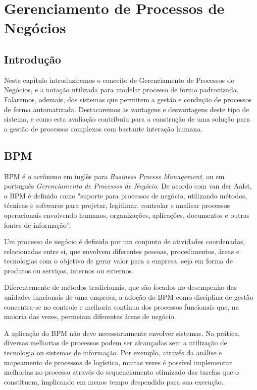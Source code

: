 \chapter{Gerenciamento de Processos de Negócios}\label{chp:bpm}

\section{Introdução}\label{sec:bpm-intro}

Neste capítulo introduziremos o conceito de Gerenciamento de Processos de Negócios, e a notação utilizada para modelar processo de forma padronizada. Falaremos, ademais, dos sistemas que permitem a gestão e condução de processos de forma automatizada. Destacaremos as vantagens e desvantagens deste tipo de sistema, e como esta avaliação contribuiu para a construção de uma solução para a gestão de processos complexos com bastante interação humana.

\section{BPM}\label{sec:bpm-bpm}
BPM\cite{bpm} é o acrônimo em inglês para \textit{Business Process Management}, ou em português \textit{Gerenciamento de Processos de Negócio}. De acordo com van der Aalst\cite{bpm_van_der_aalst}, o BPM é definido como "suporte para processos de negócio, utilizando métodos, técnicas e softwares para projetar, legitimar, controlar e analisar processos operacionais envolvendo humanos, organizações, aplicações, documentos e outras fontes de informação”.

Um processo de negócio é definido por um conjunto de atividades coordenadas, relacionadas entre si, que envolvem diferentes pessoas, procedimentos, áreas e tecnologias com o objetivo de gerar valor para a empresa, seja em forma de produtos ou serviços, internos ou externos.

Diferentemente de métodos tradicionais, que são focados no desempenho das unidades funcionais de uma empresa, a adoção do BPM como disciplina de gestão concentra-se no controle e melhoria contínua dos processos funcionais que, na maioria das vezes, permeiam diferentes áreas de negócio.

A aplicação do BPM não deve necessariamente envolver sistemas. Na prática, diversas melhorias de processos podem ser alcançadas sem a utilização de tecnologia ou sistemas de informação. Por exemplo, através da análise e mapeamento de processos de logística, muitas vezes é possível implementar melhorias no processo através do sequenciamento otimizado das tarefas que o constituem, implicando em menos tempo despendido para sua execução.

